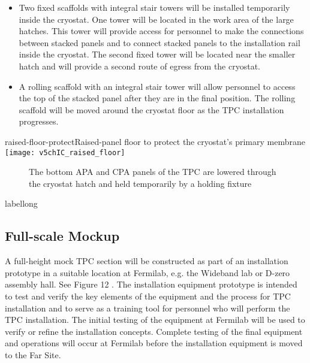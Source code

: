 \begin{itemize}
\item Two fixed scaffolds with integral stair towers will be installed temporarily inside the cryostat. One tower will be located in the work area of the large hatches. This tower will provide access for personnel to make the connections between stacked panels and to connect stacked panels to the installation rail inside the cryostat. The second fixed tower will be located near the smaller hatch and will provide a second route of egress from the cryostat. 
\item A rolling scaffold with an integral stair tower will allow personnel to access the top of the stacked panel after they are in the final position. The rolling scaffold will be moved around the cryostat floor as the TPC installation progresses. 
\end{itemize}

\begin{cdrfigure}{raised-floor-protect}{Raised-panel floor to protect the cryostat's primary membrane}
\texttt{[image: v5chIC\_raised\_floor]}
\end{cdrfigure}

\begin{figure}[htbp]
\centering
\caption{The bottom APA and CPA panels of the TPC are lowered through the cryostat hatch and held temporarily by a holding fixture } 
\label{fig:panels-lowered-hatch}
\end{figure}
\begin{cdrfigure}[short]{label}{long}
\end{cdrfigure}

\subsection{Full-scale Mockup}
\label{fd:install:tempeqp:fsmockup}

A full-height mock TPC section will be constructed as part of an installation prototype in a suitable location at Fermilab, e.g. the Wideband lab or D-zero assembly hall. See Figure 12 . The installation 
equipment prototype is intended to test and verify the key elements of the equipment and the process for TPC installation and to serve as a training tool for personnel who will perform the TPC installation. The initial testing of the equipment at Fermilab will be used to verify or refine the installation concepts. 
Complete testing of the final equipment and operations will occur at Fermilab before the installation equipment is moved to the Far Site. 


